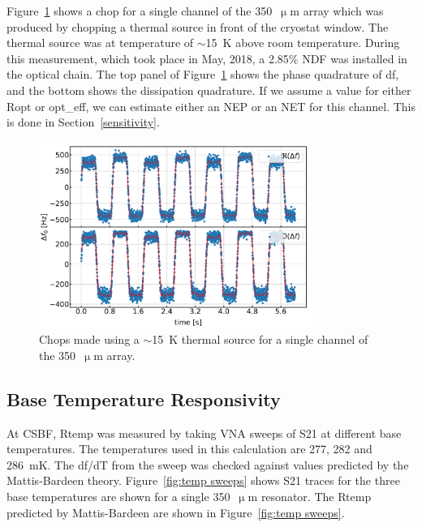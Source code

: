 Figure~\ref{fig:T chop} shows a chop for a single channel of the 350~$\upmu$m array which was produced by chopping a thermal source in front of the cryostat window. The thermal source was at temperature of $\sim$15~K above room temperature. During this measurement, which took place in May, 2018, a 2.85\% NDF was installed in the optical chain. The top panel of Figure~\ref{fig:T chop} shows the phase quadrature of \gls{df}, and the bottom shows the dissipation quadrature. If we assume a value for either \gls{Ropt} or \gls{opt_eff}, we can estimate either an NEP or an NET for this channel. This is done in Section~\ref{sensitivity}.

\begin{figure}[!htbp]
\centering
\includegraphics[width=0.8\textwidth]{figures/blast_data/timestreams/may_15K_chop_c374}
\caption[~Chops made using a \macrocapwrap{$\sim$}15~K thermal source for a single channel of the 350~ array.]{Chops made using a $\sim$15~K thermal source for a single channel of the 350~$\upmu$m array.}
\label{fig:T chop}
\end{figure}

\subsection{Base Temperature Responsivity}

At CSBF, \gls{Rtemp} was measured by taking VNA sweeps of \gls{S21} at different base temperatures. The temperatures used in this calculation are 277, 282 and 286~mK. The df/dT from the sweep was checked against values predicted by the Mattis-Bardeen theory. Figure~\ref{fig:temp sweeps} shows \gls{S21} traces for the three base temperatures are shown for a single 350~$\upmu$m resonator. The \gls{Rtemp} predicted by Mattis-Bardeen are shown in Figure~\ref{fig:temp sweeps}.

